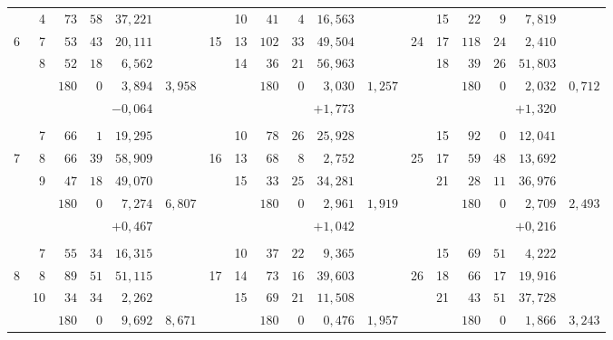 \begin{center}
\begin{tabular}{|r|r|r@{\;}r@{\;}r|r||r|r|r@{\;}r@{\;}r|r||r|r|r@{\;}r@{\;}r|r|}
 & 4 & $73$ & $58$ & $37{,}221$ &  &  & 10 & $41$ & $4$ & $16{,}563$ &  &  & 15 & $22$ & $9$ & $7{,}819$ & \\
6 & 7 & $53$ & $43$ & $20{,}111$ &  & 15 & 13 & $102$ & $33$ & $49{,}504$ &  & 24 & 17 & $118$ & $24$ & $2{,}410$ & \\
 & 8 & $52$ & $18$ & $6{,}562$ &  &  & 14 & $36$ & $21$ & $56{,}963$ &  &  & 18 & $39$ & $26$ & $51{,}803$ & \\
\cline{3-5}\cline{9-11}\cline{15-17}
 &  & $180$ & $0$ & $3{,}894$ & $3{,}958$ &  &  & $180$ & $0$ & $3{,}030$ & $1{,}257$ &  &  & $180$ & $0$ & $2{,}032$ & $0{,}712$\\
 &  & \multicolumn{3}{r|}{$-0{,}064$} &  &  &  & \multicolumn{3}{r|}{$+1{,}773$} &  &  &  & \multicolumn{3}{r|}{$+1{,}320$} & \\
 &  &  &  &  &  &  &  &  &  &  &  &  &  &  &  &  & \\
 & 7 & $66$ & $1$ & $19{,}295$ &  &  & 10 & $78$ & $26$ & $25{,}928$ &  &  & 15 & $92$ & $0$ & $12{,}041$ & \\
7 & 8 & $66$ & $39$ & $58{,}909$ &  & 16 & 13 & $68$ & $8$ & $2{,}752$ &  & 25 & 17 & $59$ & $48$ & $13{,}692$ & \\
 & 9 & $47$ & $18$ & $49{,}070$ &  &  & 15 & $33$ & $25$ & $34{,}281$ &  &  & 21 & $28$ & $11$ & $36{,}976$ & \\
\cline{3-5}\cline{9-11}\cline{15-17}
 &  & $180$ & $0$ & $7{,}274$ & $6{,}807$ &  &  & $180$ & $0$ & $2{,}961$ & $1{,}919$ &  &  & $180$ & $0$ & $2{,}709$ & $2{,}493$\\
 &  & \multicolumn{3}{r|}{$+0{,}467$} &  &  &  & \multicolumn{3}{r|}{$+1{,}042$} &  &  &  & \multicolumn{3}{r|}{$+0{,}216$} & \\
 &  &  &  &  &  &  &  &  &  &  &  &  &  &  &  &  & \\
 & 7 & $55$ & $34$ & $16{,}315$ &  &  & 10 & $37$ & $22$ & $9{,}365$ &  &  & 15 & $69$ & $51$ & $4{,}222$ & \\
8 & 8 & $89$ & $51$ & $51{,}115$ &  & 17 & 14 & $73$ & $16$ & $39{,}603$ &  & 26 & 18 & $66$ & $17$ & $19{,}916$ & \\
 & 10 & $34$ & $34$ & $2{,}262$ &  &  & 15 & $69$ & $21$ & $11{,}508$ &  &  & 21 & $43$ & $51$ & $37{,}728$ & \\
\cline{3-5}\cline{9-11}\cline{15-17}
 & \llap{\raisebox{.5ex}{.}\hspace{.4em}} & $180$ & $0$ & $9{,}692$ & $8{,}671$ &  &  & $180$ & $0$ & $0{,}476$ & $1{,}957$ &  &  & $180$ & $0$ & $1{,}866$ & $3{,}243$\\

\end{tabular}
\end{center}
